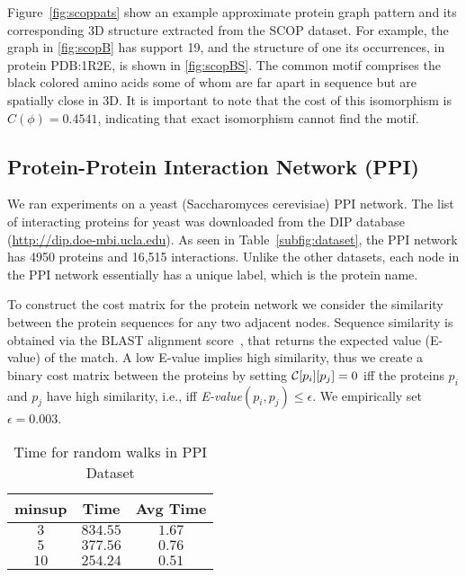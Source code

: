 \smallskip{}
Figure~\ref{fig:scoppats} show an example approximate protein graph
pattern and its corresponding 3D structure extracted from the SCOP
dataset.  
For example, the graph in \ref{fig:scopB} has support 19, and the
structure of one its occurrences, in protein PDB:1R2E, is shown in
\ref{fig:scopBS}. The common motif comprises the black colored amino
acids some of whom are far apart in sequence but are spatially close in 3D.
It is important to note that the cost of this isomorphism
is $C(\phi) = 0.4541$, indicating that exact isomorphism cannot find the
motif.

\subsection{Protein-Protein Interaction Network (PPI)} We ran
experiments on a yeast (Saccharomyces cerevisiae) PPI network. The list of
interacting proteins for yeast was downloaded from the DIP database
(\url{http://dip.doe-mbi.ucla.edu}). As seen in
Table~\ref{subfig:dataset}, the
PPI network has 4950 proteins and 16,515 interactions.  Unlike the other
datasets, each node in the PPI network essentially has a unique label,
which is the protein name.  

\smallskip{} 
To construct the cost matrix for the protein network we consider the
similarity between the protein sequences for any two adjacent nodes.
Sequence similarity is obtained via the BLAST alignment
score~\cite{altschul90}, that returns the expected value (E-value) of
the match. A low E-value implies high similarity, thus we create a
binary cost matrix between the proteins by setting
$\mathcal{C}[p_i][p_j] =0$ iff the proteins $p_i$ and $p_j$ have high
similarity, i.e., iff {\em E-value}$(p_i, p_j) \le \epsilon$. We empirically 
set $\epsilon = 0.003$.


\begin{table}[!h]
\centering
\begin{tabular}{|c|c|c|}
        \hline
        minsup & Time & Avg Time \\
		\hline
        $3$ & $834.55$ & $1.67$ \\
        $5$ & $377.56$ & $0.76$ \\
        $10$ & $254.24$ & $0.51$ \\
		\hline
    \end{tabular}
    \caption{Time for random walks in PPI Dataset }
\label{tab:ppi}
\end{table}

